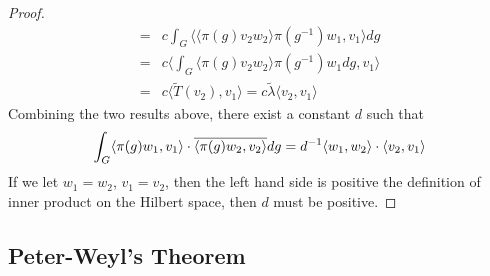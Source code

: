 \begin{proof}
\begin{align*}
    = & c \int_G \langle \langle \pi(g)v_2 w_2 \rangle \pi(g^{-1})w_1 , v_1 \rangle dg\\
    = & c \langle \int_G \langle \pi(g)v_2 w_2 \rangle \pi(g^{-1})w_1 dg , v_1 \rangle\\
    = & c \langle \widetilde{T}(v_2), v_1 \rangle = c \widetilde{\lambda} \langle v_2, v_1 \rangle
  \end{align*}
  Combining the two results above, there exist a constant $d$ such that
  \[
    \int_G \langle \pi(g)w_1, v_1 \rangle \cdot \overline{\langle \pi(g)w_2, v_2 \rangle} dg
    = d^{-1} \langle w_1, w_2 \rangle \cdot \langle v_2, v_1 \rangle
  \]
  If we let $w_1 = w_2$, $v_1 = v_2$, then the left hand side is positive the
  definition of inner product on the Hilbert space, then $d$ must be positive.
\end{proof}





  






\subsection{Peter-Weyl's Theorem}

